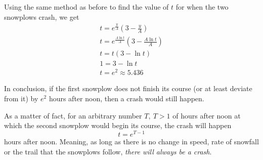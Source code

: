 \documentclass[a4paper,12pt]{article}
\begin{document}
        Using the same method as before to find the value of \(t\) for when the two snowplows crash, we get
        \begin{gather*}
            t = e^{\frac{y}{A}}\left(3-\frac{y}{A}\right) \\
            t = e^\frac{A \ln t}{A}\left(3 - \frac{A \ln t}{A}\right) \\
            t = t(3 - \ln t) \\
            1 = 3 - \ln t \\
            t = e^2 \approx 5.436
        \end{gather*}

        In conclusion, if the first snowplow does not finish its course (or at least deviate from it) by $e^2$ hours after noon, then a crash would still happen.

        \hfill \break
        As a matter of fact, for an arbitrary number $T, \ T > 1$ of hours after noon at which the second snowplow would begin its course, the crash will happen
        \[ t = e^{T-1} \]
        hours after noon. Meaning, as long as there is no change in speed, rate of snowfall or the trail that the snowplows follow, \emph{there will always be a crash}.
    

\newpage \printbibliography
\end{document}
